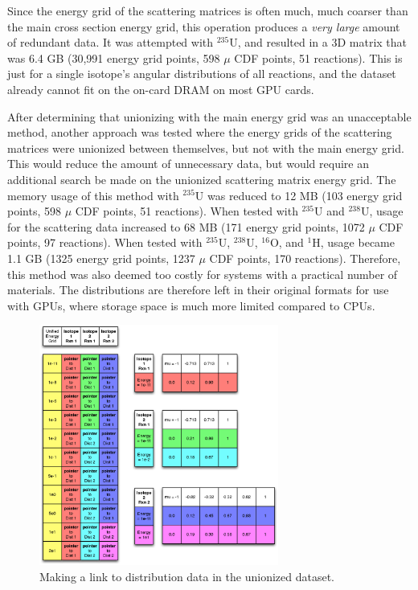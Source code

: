 Since the energy grid of the scattering matrices is often much, much coarser than the main cross section energy grid, this operation produces a \emph{very large} amount of redundant data.  It was attempted with $^{235}$U, and resulted in a 3D matrix that was 6.4 GB (30,991 energy grid points, 598 $\mu$ CDF points, 51 reactions).  This is just for a single isotope's angular distributions of all reactions, and the dataset already cannot fit on the on-card DRAM on most GPU cards.  

After determining that unionizing with the main energy grid was an unacceptable method, another approach was tested where the energy grids of the scattering matrices were unionized between themselves, but not with the main energy grid.  This would reduce the amount of unnecessary data, but would require an additional search be made on the unionized scattering matrix energy grid.  The memory usage of this method with $^{235}$U was reduced to 12 MB (103 energy grid points, 598 $\mu$ CDF points, 51 reactions).  When tested with $^{235}$U and $^{238}$U, usage for the scattering data increased to 68 MB (171 energy grid points, 1072 $\mu$ CDF points, 97 reactions).  When tested with $^{235}$U, $^{238}$U, $^{16}$O, and $^{1}$H, usage became 1.1 GB (1325 energy grid points, 1237 $\mu$ CDF points, 170 reactions).  Therefore, this method was also deemed too costly for systems with a practical number of materials.  The distributions are therefore left in their original formats for use with GPUs, where storage space is much more limited compared to CPUs.


\begin{figure}[h!] 
\centering
\includegraphics[width=0.7\textwidth]{graphics/unionized_pointers.eps}
\caption{Making a link to distribution data in the unionized dataset. \label{unionized_pointers} }
\end{figure}

